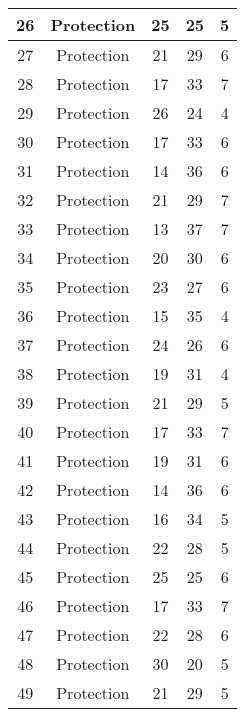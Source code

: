 \documentclass[results.tex]{subfiles}
\begin{document}
\begin{center}
\begin{tabular}{| c || c | c | c | c |}
    \hline
    26 & Protection & 25 & 25 & 5 \\ 
    \hline
    27 & Protection & 21 & 29 & 6 \\ 
    \hline
    28 & Protection & 17 & 33 & 7 \\ 
    \hline
    29 & Protection & 26 & 24 & 4 \\ 
    \hline
    30 & Protection & 17 & 33 & 6 \\ 
    \hline
    31 & Protection & 14 & 36 & 6 \\ 
    \hline
    32 & Protection & 21 & 29 & 7 \\ 
    \hline
    33 & Protection & 13 & 37 & 7 \\ 
    \hline
    34 & Protection & 20 & 30 & 6 \\ 
    \hline
    35 & Protection & 23 & 27 & 6 \\ 
    \hline
    36 & Protection & 15 & 35 & 4 \\ 
    \hline
    37 & Protection & 24 & 26 & 6 \\ 
    \hline
    38 & Protection & 19 & 31 & 4 \\ 
    \hline
    39 & Protection & 21 & 29 & 5 \\ 
    \hline
    40 & Protection & 17 & 33 & 7 \\ 
    \hline
    41 & Protection & 19 & 31 & 6 \\ 
    \hline
    42 & Protection & 14 & 36 & 6 \\ 
    \hline
    43 & Protection & 16 & 34 & 5 \\ 
    \hline
    44 & Protection & 22 & 28 & 5 \\ 
    \hline
    45 & Protection & 25 & 25 & 6 \\ 
    \hline
    46 & Protection & 17 & 33 & 7 \\ 
    \hline
    47 & Protection & 22 & 28 & 6 \\ 
    \hline
    48 & Protection & 30 & 20 & 5 \\ 
    \hline
    49 & Protection & 21 & 29 & 5 \\ 
    \hline   \end{tabular}
\end{center}
\end{document}
